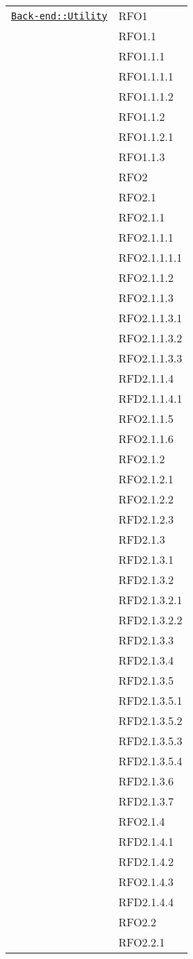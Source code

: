\begin{longtable}{|>{\centering}m{10cm}|m{3cm}<{\centering}|}
\hyperref[Back-end::Utility]{\texttt{Back-end::Utility}} & RFO1\\
& RFO1.1\\
& RFO1.1.1\\
& RFO1.1.1.1\\
& RFO1.1.1.2\\
& RFO1.1.2\\
& RFO1.1.2.1\\
& RFO1.1.3\\
& RFO2\\
& RFO2.1\\
& RFO2.1.1\\
& RFO2.1.1.1\\
& RFO2.1.1.1.1\\
& RFO2.1.1.2\\
& RFO2.1.1.3\\
& RFO2.1.1.3.1\\
& RFO2.1.1.3.2\\
& RFO2.1.1.3.3\\
& RFD2.1.1.4\\
& RFD2.1.1.4.1\\
& RFO2.1.1.5\\
& RFO2.1.1.6\\
& RFO2.1.2\\
& RFO2.1.2.1\\
& RFO2.1.2.2\\
& RFD2.1.2.3\\
& RFD2.1.3\\
& RFD2.1.3.1\\
& RFD2.1.3.2\\
& RFD2.1.3.2.1\\
& RFD2.1.3.2.2\\
& RFD2.1.3.3\\
& RFD2.1.3.4\\
& RFD2.1.3.5\\
& RFD2.1.3.5.1\\
& RFD2.1.3.5.2\\
& RFD2.1.3.5.3\\
& RFD2.1.3.5.4\\
& RFD2.1.3.6\\
& RFD2.1.3.7\\
& RFO2.1.4\\
& RFD2.1.4.1\\
& RFD2.1.4.2\\
& RFO2.1.4.3\\
& RFD2.1.4.4\\
& RFO2.2\\
& RFO2.2.1\\

\end{longtable}
